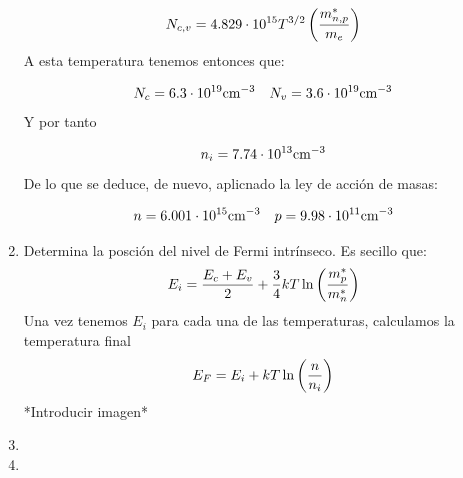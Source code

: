 \begin{texercise}
\begin{enumerate}[label=\alph*)]
		\begin{equation}
			N_{c,v} = 4.829\cdot 10^{15} T^{3/2} \left( \frac{m_{n,p}^*}{m_e} \right)
		\end{equation}
		A esta temperatura tenemos entonces que:

		\begin{equation}
			N_c = 6.3 \cdot 10^{19} \text{cm}^{-3} \quad N_v = 3.6 \cdot 10^{19} \text{cm}^{-3}
		\end{equation}
		Y por tanto

		\begin{equation}
			n_i = 7.74 \cdot 10^{13} \text{cm}^{-3}
		\end{equation}
		De lo que se deduce, de nuevo, aplicnado la ley de acción de masas:

		\begin{equation}
			n=6.001 \cdot 10^{15} \text{cm}^{-3} \quad p = 9.98 \cdot 10^{11} \text{cm}^{-3}
		\end{equation}
		\item Determina la posción del nivel de Fermi intrínseco. Es secillo que: 
		\begin{equation}
			E_i = \frac{E_c + E_v}{2} + \frac{3}{4} kT \ln \left( \frac{m_p^*}{m_n^*} \right) 
		\end{equation}
		Una vez tenemos $E_i$ para cada una de las temperaturas, calculamos la temperatura final
		\begin{equation}
			E_F = E_i + kT \ln \left( \frac{n}{n_i} \right)
		\end{equation}
		*Introducir imagen*
		\item 
		\item
\end{enumerate}


	
\end{texercise}


